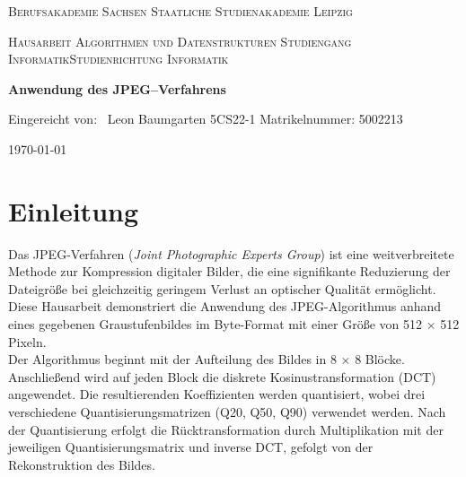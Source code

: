 \documentclass[12pt]{article}
\begin{document}
	
	\begin{titlepage}
		\centering
		{\scshape\Large Berufsakademie Sachsen \linebreak Staatliche Studienakademie Leipzig \par}
		\vspace{1cm}
		{\scshape\Large Hausarbeit Algorithmen und Datenstrukturen \linebreak Studiengang Informatik\linebreak Studienrichtung Informatik \par}
		\vspace{1.5cm}
		{\huge\bfseries Anwendung des JPEG–Verfahrens \par}
		\vspace{2cm}
		{\large  Eingereicht von: \ Leon Baumgarten \linebreak 5CS22-1 \linebreak Matrikelnummer: 5002213 \par}
		
		\vfill
		
		{\large \today\par}
	\end{titlepage}
	\thispagestyle{empty}
	
	\tableofcontents
	\newpage
	
	\setcounter{page}{1}
	\section{Einleitung}
	
	Das JPEG-Verfahren (\textit{Joint Photographic Experts Group}) ist eine weitverbreitete Methode zur Kompression digitaler Bilder, die eine signifikante Reduzierung der Dateigröße bei gleichzeitig geringem Verlust an optischer Qualität ermöglicht. Diese Hausarbeit demonstriert die Anwendung des JPEG-Algorithmus anhand eines gegebenen Graustufenbildes im Byte-Format mit einer Größe von 512 × 512 Pixeln. \\
	
	Der Algorithmus beginnt mit der Aufteilung des Bildes in 8 × 8 Blöcke. Anschließend wird auf jeden Block die diskrete Kosinustransformation (DCT) angewendet. Die resultierenden Koeffizienten werden quantisiert, wobei drei verschiedene Quantisierungsmatrizen (Q20, Q50, Q90) verwendet werden. Nach der Quantisierung erfolgt die Rücktransformation durch Multiplikation mit der jeweiligen Quantisierungsmatrix und inverse DCT, gefolgt von der Rekonstruktion des Bildes. \\
	
\end{document}
